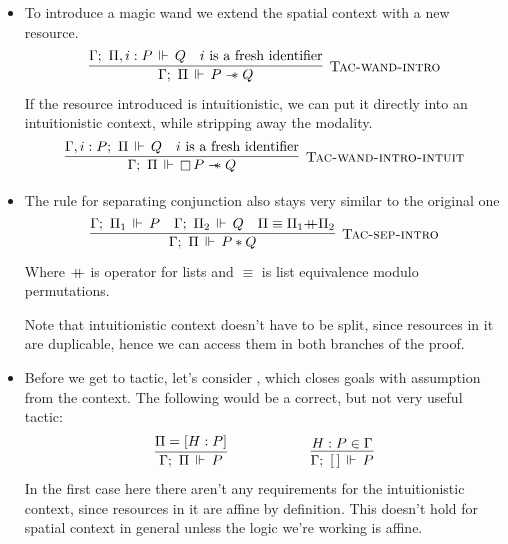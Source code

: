 \begin{itemize}
\item To introduce a magic wand we extend the spatial context with a new resource.
  \[\infer[\textsc{Tac-wand-intro}]
      {\entailsD P \wand Q}
      {\entails {\IntuD} {\SpatD, i : P} {Q} &
       i \text{ is a fresh identifier}}
  \]
  If the resource introduced is intuitionistic, we can put it directly into an intuitionistic context, while stripping away the modality.
  \[\infer[\textsc{Tac-wand-intro-intuit}]
      {\entailsD \intuit P \wand Q}
      {\entails {\IntuD, i : P} {\SpatD} {Q} &
       i \text{ is a fresh identifier}}
  \]
\item The rule for separating conjunction also stays very similar to the original one
  \[\infer[\textsc{Tac-sep-intro}]
      {\entailsD P * Q}
      {\entails {\IntuD} {\SpatD_1} P &
       \entails {\IntuD} {\SpatD_2} Q &
       \SpatD \equiv \SpatD_1 {+\hspace{-0.5em}+} \SpatD_2}
   \]
   Where \({+\hspace{-0.5em}+}\) is  operator for lists and \(\equiv\) is list equivalence modulo permutations.

   Note that intuitionistic context doesn't have to be split, since resources in it are duplicable, hence we can access them in both branches of the proof.
\item Before we get to  tactic, let's consider , which closes goals with assumption  from the context.
  The following would be a correct, but not very useful tactic:
  \begin{align*}
      \infer
        {\entailsD P}
        {\SpatD = [H : P]}
    & \hspace{5em}
    & \infer
        {\entails {\IntuD} {[\,]} P}
        {H : P \in \IntuD}
  \end{align*}
  In the first case here there aren't any requirements for the intuitionistic context, since resources in it are affine by definition.
  This doesn't hold for spatial context in general unless the logic we're working is affine.


\end{itemize}

